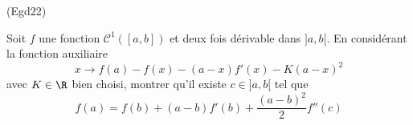 \begin{tiny}(Egd22)\end{tiny} \label{taylor} Soit $f$ une fonction $\mathcal{C}^1([a,b])$ et deux fois dérivable dans $]a,b[$. En considérant la fonction auxiliaire
\begin{displaymath}
 x\rightarrow f(a)-f(x)-(a-x)f'(x)-K(a-x)^2
\end{displaymath}
avec $K\in \R$ bien choisi, montrer qu'il existe $c\in ]a,b[$ tel que
\begin{displaymath}
 f(a)=f(b)+(a-b)f'(b)+\frac{(a-b)^2}{2}f''(c)
\end{displaymath}

